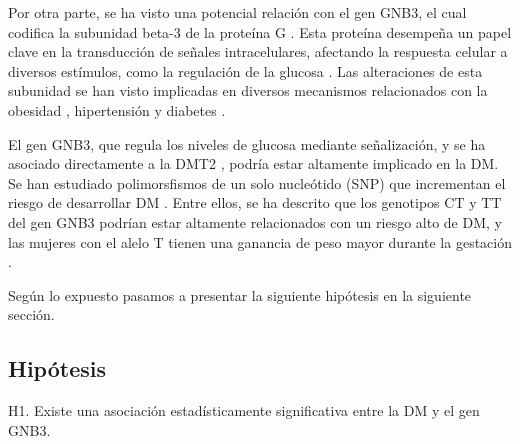 Por otra parte, se ha visto una potencial relación con el gen GNB3, el cual codifica la subunidad beta-3 de la proteína G \cite{Feng2019}. Esta proteína desempeña un papel clave en la transducción de señales intracelulares, afectando la respuesta celular a diversos estímulos, como la regulación de la glucosa \cite{Neves2002}. Las alteraciones de esta subunidad se han visto implicadas en diversos mecanismos relacionados con la obesidad \cite{Hsiao2013}, hipertensión y diabetes \cite{Siffert2005}.
 
El gen GNB3, que regula los niveles de glucosa mediante señalización, y se ha asociado directamente a la DMT2 \cite{Rizvi2016}, podría estar altamente implicado en la DM. Se han estudiado polimorsfismos de un solo nucleótido (SNP) que incrementan el riesgo de desarrollar DM \cite{ortega}. Entre ellos, se ha descrito que los genotipos CT y TT  del gen GNB3 podrían estar altamente relacionados con un riesgo alto de DM, y las mujeres con el alelo T tienen una ganancia de peso mayor durante la gestación \cite{ortega}. 


Según lo expuesto pasamos a presentar la siguiente hipótesis en la siguiente sección.

\subsection{Hipótesis}

H1. Existe una asociación estadísticamente significativa entre la DM y el gen GNB3.